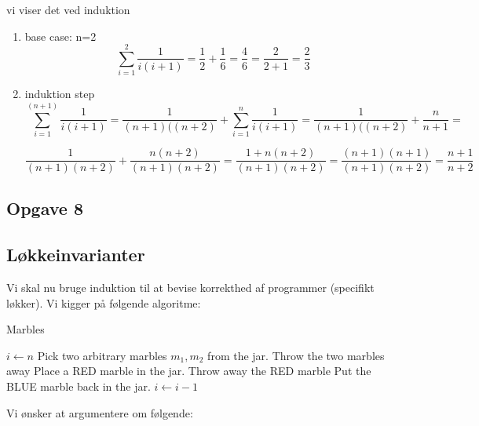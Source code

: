 \documentclass{article}
\theoremstyle{definition}
\begin{document}
\begin{enumerate}
     vi viser det ved induktion
    \begin{enumerate}
        \item base case: n=2
        \[ \sum_{i=1}^2 \frac{1}{i(i+1)} = \frac{1}{2}+\frac{1}{6} = \frac{4}{6} = \frac{2}{2+1}=\frac{2}{3}\]
        \item induktion step
        \[
        \sum_{i=1}^{(n+1)} \frac{1}{i(i+1)} =  \frac{1}{(n+1)((n+2)} + \sum_{i=1}^n \frac{1}{i(i+1)} = \frac{1}{(n+1)((n+2)} + \frac{n}{n+1} =\] 
        
        \[
        \frac{1}{(n+1)(n+2)} + \frac{n(n+2)}{(n+1)(n+2)} = \frac{1+n(n+2)}{(n+1)(n+2)} =  \frac{(n+1)(n+1)}{(n+1)(n+2)} = \frac{n+1}{n+2}
        \]
    \end{enumerate}
\end{enumerate}

\subsection{Opgave 8}
\subsection{Løkkeinvarianter}

Vi skal nu bruge induktion til at bevise korrekthed af programmer (specifikt løkker). Vi kigger på følgende algoritme:

\begin{algorithm}
\caption{Marbles}
\begin{algorithmic}[1]
\State $i \leftarrow n$
    \State Pick two arbitrary marbles $m_1, m_2$ from the jar.
        \State Throw the two marbles away
        \State Place a RED marble in the jar.
    \Else
        \State Throw away the RED marble
        \State Put the BLUE marble back in the jar.
    \EndIf
    \State $i \leftarrow i-1$
\EndWhile
\end{algorithmic}
\end{algorithm}

Vi ønsker at argumentere om følgende:
\end{document}
